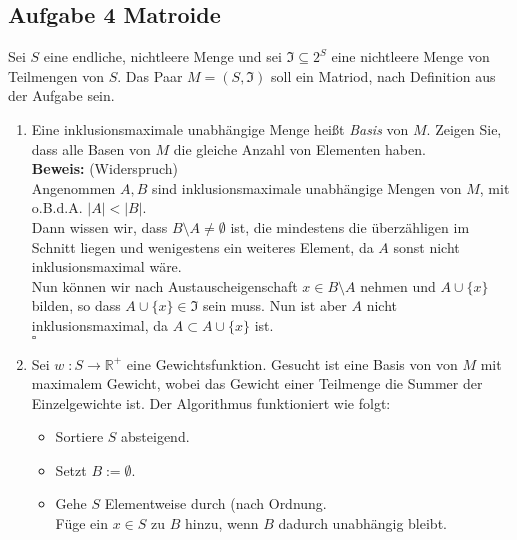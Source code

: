 \documentclass[11pt,a4paper,ngerman]{article}
\begin{document}
\subsection*{Aufgabe 4 \mdseries Matroide}

Sei $S$ eine endliche, nichtleere Menge und sei $\mathfrak{I} \subseteq 2^S$ eine nichtleere Menge von Teilmengen von $S$. Das Paar $M = (S, \mathfrak{I})$ soll ein Matriod, nach Definition aus der Aufgabe sein.

\begin{enumerate}[\bfseries (a)]

\item Eine inklusionsmaximale unabhängige Menge heißt \emph{Basis} von $M$. Zeigen Sie, dass alle Basen von $M$ die gleiche Anzahl von Elementen haben.\\

\textbf{Beweis:} (Widerspruch)\\
Angenommen $A,B$ sind inklusionsmaximale unabhängige Mengen von $M$, mit o.B.d.A. $|A| < |B|$.\\
Dann wissen wir, dass $B \setminus A \not= \emptyset$ ist, die mindestens die überzähligen im Schnitt liegen und wenigestens ein weiteres Element, da $A$ sonst nicht inklusionsmaximal wäre.\\

Nun können wir nach Austauscheigenschaft $x \in B \setminus A$ nehmen und $A \cup \{x \}$ bilden, so dass $A \cup \{ x \} \in \mathfrak{I}$ sein muss. Nun ist aber $A$ nicht inklusionsmaximal, da $A \subset A \cup \{x \}$ ist.\\
\mbox{} \hfill $\square$

\item Sei $w \; : S \longrightarrow \mathbb{R}^+$ eine Gewichtsfunktion. Gesucht ist eine Basis von von $M$ mit maximalem Gewicht, wobei das Gewicht einer Teilmenge die Summer der Einzelgewichte ist. Der Algorithmus funktioniert wie folgt:\\

\begin{itemize}

\item Sortiere $S$ absteigend.

\item Setzt $B := \emptyset$.

\item Gehe $S$ Elementweise durch (nach Ordnung.\\
Füge ein $x \in S$ zu $B$ hinzu, wenn $B$ dadurch unabhängig bleibt.


\end{itemize}
\end{enumerate}
\end{document}
